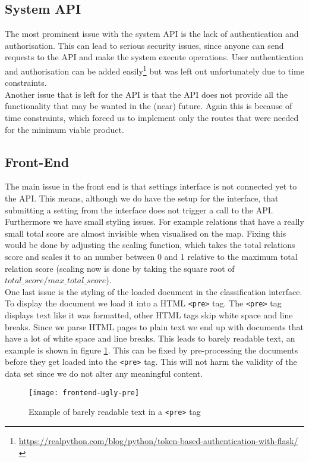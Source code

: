\subsection{System API}
The most prominent issue with the system API is the lack of authentication and authorisation. This can lead to serious security issues, since anyone can send requests to the API and make the system execute operations. User authentication and authorisation can be added easily\footnote{\url{https://realpython.com/blog/python/token-based-authentication-with-flask/}} but was left out unfortunately due to time constraints.\\
Another issue that is left for the API is that the API does not provide all the functionality that may be wanted in the (near) future. Again this is because of time constraints, which forced us to implement only the routes that were needed for the minimum viable product.

\subsection{Front-End}
The main issue in the front end is that settings interface is not connected yet to the API. This means, although we do have the setup for the interface, that submitting a setting from the interface does not trigger a call to the API.\\
Furthermore we have small styling issues. For example relations that have a really small total score are almost invisible when visualised on the map. Fixing this would be done by adjusting the scaling function, which takes the total relations score and scales it to an number between 0 and 1 relative to the maximum total relation score (scaling now is done by taking the square root of $total\_score/max\_total\_score$).\\
One last issue is the styling of the loaded document in the classification interface. To display the document we load it into a HTML \texttt{<pre>} tag. The \texttt{<pre>} tag displays text like it was formatted, other HTML tags skip white space and line breaks. Since we parse HTML pages to plain text we end up with documents that have a lot of white space and line breaks. This leads to barely readable text, an example is shown in figure \ref{fig:ugly-pre}. This can be fixed by pre-processing the documents before they get loaded into the \texttt{<pre>} tag. This will not harm the validity of the data set since we do not alter any meaningful content.

\begin{figure}[H]
\centering
\texttt{[image: frontend-ugly-pre]}
\caption{Example of barely readable text in a \texttt{<pre>} tag}
\label{fig:ugly-pre}
\end{figure}

